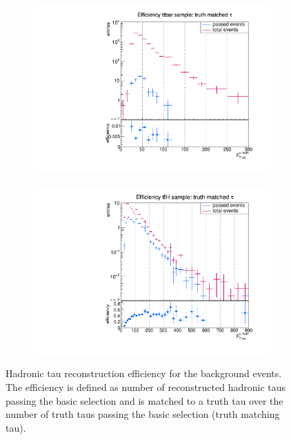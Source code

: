 %   
\begin{figure}
  \centering
                \begin{subfigure}[t]{0.49\textwidth}
                \includegraphics[width=\textwidth]{figures/plots/ttbar/Divided_Tau.pdf}
                \label{DividedTau:bg:ttbar}
                \end{subfigure}
                \begin{subfigure}[t]{0.49\textwidth}
                \includegraphics[width=\textwidth]{figures/plots/ttH/Divided_Tau.pdf}
                \label{DividedTau:bg:ttH}
                \end{subfigure}
\caption[Hadronic tau reconstruction efficiency for the background events.]{Hadronic tau reconstruction efficiency for the background events. The efficiency is defined as number of reconstructed hadronic taus passing the basic selection and is matched to a truth tau over the number of truth taus passing the basic selection (truth matching tau).}
\label{DividedTau:bg}
\end{figure}
